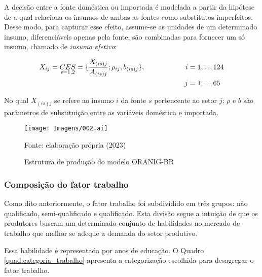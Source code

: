 A decisão entre a fonte doméstica ou importada é modelada a partir da hipótese de \textcite{armington69} a qual relaciona os insumos de ambas as fontes como substitutos imperfeitos. Desse modo, para capturar esse efeito, assume-se as unidades de um determinado insumo, diferenciáveis apenas pela fonte, são combinadas para fornecer um só insumo, chamado de \textit{insumo efetivo}:

\begin{align}
	X_{ij} = \underset{s = 1, 2}{CES} = \{\frac{X_{(is)j}}{A_{(is)j}}; \rho_{ij}, b_{(is)j}\}, \hspace{2cm} i & = 1, ... , 124 \\ j & = 1, ... , 65 \notag
\end{align}

No qual $X_{(is)j}$ se refere ao insumo $i$ da fonte $s$ pertencente ao setor $j$; $\rho$ e $b$ são parâmetros de substituição entre as variáveis doméstica e importada. 

\begin{landscape}
	\begin{figure}
		\centering
		\texttt{[image: Imagens/002.ai]}
		\caption{Estrutura de produção do modelo ORANIG-BR}
		\label{fig:estrutura_producao}
		\footnotesize
		Fonte: elaboração própria (2023)
	\end{figure}
\end{landscape}

\subsubsection{Composição do fator trabalho} \label{}

Como dito anteriormente, o fator trabalho foi subdividido em três grupos: não qualificado, semi-qualificado e qualificado. Esta divisão segue a intuição de que os produtores buscam um determinado conjunto de habilidades no mercado de trabalho que melhor se adeque a demanda do setor produtivo.

Essa habilidade é representada por anos de educação. O Quadro \ref{quad:categoria_trabalho} apresenta a categorização escolhida para desagregar o fator trabalho.

